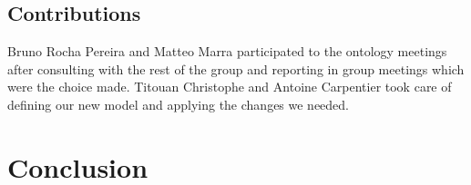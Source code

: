 \documentclass[a4paper]{article}
\begin{document}
\subsection{Contributions}
Bruno Rocha Pereira and Matteo Marra participated to the ontology meetings after consulting with the rest of the group and reporting in group meetings which were the choice made. 
Titouan Christophe and Antoine Carpentier took care of defining our new model and applying the changes we needed. 

\section{Conclusion}
\end{document}
